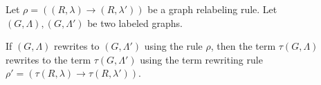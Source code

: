      

\begin{lemma}
\label{grs_to_trs_step}
Let $\rho = ((R,\lambda) \to (R,\lambda'))$ be a graph relabeling rule. 
Let $(G, \Lambda), (G,\Lambda')$ be two labeled graphs.

If $(G, \Lambda)$ rewrites to $(G, \Lambda')$ using the rule $\rho$, then the term $\tau(G,\Lambda)$ rewrites to the term $\tau(G,\Lambda')$ using the term rewriting rule $\rho' = (\tau(R,\lambda) \to \tau(R,\lambda'))$.
\end{lemma}


